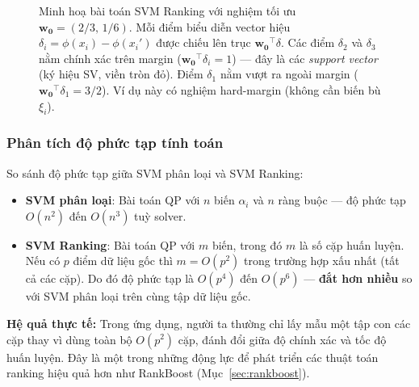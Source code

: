 \begin{figure}[H]
\caption{Minh hoạ bài toán SVM Ranking với nghiệm tối ưu $\mathbf{w_0} = (2/3,\,1/6)$.
Mỗi điểm biểu diễn vector hiệu $\delta_i = \phi(x_i) - \phi(x_i')$
được chiếu lên trục $\mathbf{w_0}^\top\delta$.
Các điểm $\delta_2$ và $\delta_3$ nằm chính xác trên margin
($\mathbf{w_0}^\top\delta_i = 1$) — đây là các \textit{support vector} (ký hiệu SV, viền tròn đỏ).
Điểm $\delta_1$ nằm vượt ra ngoài margin ($\mathbf{w_0}^\top\delta_1 = 3/2$).
Ví dụ này có nghiệm hard-margin (không cần biến bù $\xi_i$).}
\label{fig:svm_ranking_margin}
\end{figure}

\begin{morong}
\subsubsection*{Phân tích độ phức tạp tính toán}

So sánh độ phức tạp giữa SVM phân loại và SVM Ranking:

\begin{itemize}
  \item \textbf{SVM phân loại}: Bài toán QP với $n$ biến 
  $\alpha_i$ và $n$ ràng buộc — độ phức tạp 
  $O(n^2)$ đến $O(n^3)$ tuỳ solver.

  \item \textbf{SVM Ranking}: Bài toán QP với $m$ biến, 
  trong đó $m$ là số cặp huấn luyện. Nếu có $p$ điểm 
  dữ liệu gốc thì $m = O(p^2)$ trong trường hợp xấu nhất 
  (tất cả các cặp). Do đó độ phức tạp là 
  $O(p^4)$ đến $O(p^6)$ — \textbf{đắt hơn nhiều} so với 
  SVM phân loại trên cùng tập dữ liệu gốc.
\end{itemize}

\textbf{Hệ quả thực tế:} Trong ứng dụng, người ta thường 
chỉ lấy mẫu một tập con các cặp thay vì dùng toàn bộ 
$O(p^2)$ cặp, đánh đổi giữa độ chính xác và tốc độ huấn 
luyện. Đây là một trong những động lực để phát triển các 
thuật toán ranking hiệu quả hơn như RankBoost 
(Mục~\ref{sec:rankboost}).
\end{morong}


